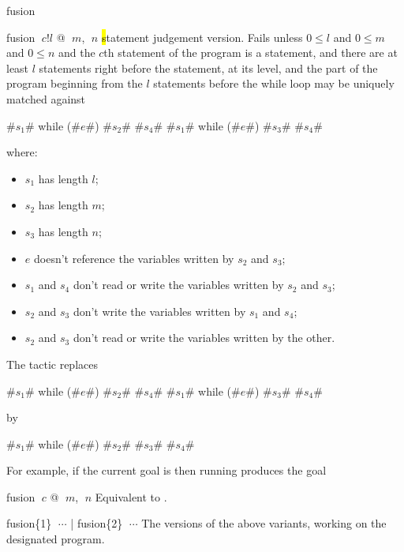 \begin{tactic}{fusion}
  \begin{tsyntax}{fusion $\;c$!$l$ @ $\;m$, $\;n$}
    \hl statement judgement version.  Fails unless $0\leq l$ and
    $0\leq m$ and $0\leq n$ and the $c$th statement of the program
    is a  statement, and there are at least $l$ statements right
    before the  statement, at its level,
    and the part of the program beginning from the $l$ statements
    before the while loop may be uniquely matched against
\begin{easycrypt}{}{}
#$s_1$# while (#$e$#) { #$s_2$# #$s_4$# }
#$s_1$# while (#$e$#) { #$s_3$# #$s_4$# }
\end{easycrypt}
    where:
    \begin{itemize}
    \item $s_1$ has length $l$;

    \item $s_2$ has length $m$;

    \item $s_3$ has length $n$;

    \item $e$ doesn't reference the variables written by $s_2$ and $s_3$;

    \item $s_1$ and $s_4$ don't read or write the variables written by
      $s_2$ and $s_3$;

    \item $s_2$ and $s_3$ don't write the variables written by $s_1$
      and $s_4$;

    \item $s_2$ and $s_3$ don't read or write the variables written by
      the other.
    \end{itemize}
    The tactic replaces
\begin{easycrypt}{}{}
#$s_1$# while (#$e$#) { #$s_2$# #$s_4$# }
#$s_1$# while (#$e$#) { #$s_3$# #$s_4$# }
\end{easycrypt}
by
\begin{easycrypt}{}{}
#$s_1$# while (#$e$#) { #$s_2$# #$s_3$# #$s_4$# }
\end{easycrypt}

    \medskip For example, if the current goal is
     then
    running 
    produces the goal
  \end{tsyntax}

  \begin{tsyntax}{fusion $\;c$ @ $\;m$, $\;n$}
    Equivalent to .
  \end{tsyntax}

  \begin{tsyntax}{fusion\{1\} $\;\cdots$ | fusion\{2\} $\;\cdots$}
    The \prhl versions of the above variants, working on the
    designated program.
  \end{tsyntax}
\end{tactic}
